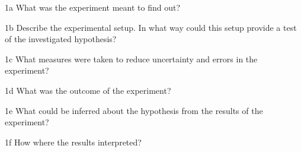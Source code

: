 \documentclass[a4paper,twoside=false,abstract=false,numbers=noenddot,
titlepage=false,headings=small,parskip=half,version=last]{scrartcl}
\begin{document}

\begin{exercise}{1a}
    What was the experiment meant to find out?
\end{exercise}
\begin{solution}
\end{solution}
\begin{exercise}{1b}
    Describe the experimental setup. In what way could this setup provide a
    test of the investigated hypothesis?
\end{exercise}
\begin{solution}
\end{solution}
\begin{exercise}{1c}
    What measures were taken to reduce uncertainty and errors in the
    experiment?
\end{exercise}
\begin{solution}
\end{solution}
\begin{exercise}{1d} 
    What was the outcome of the experiment?
\end{exercise}
\begin{solution}
\end{solution}
\begin{exercise}{1e}
    What could be inferred about the hypothesis from the results of the
    experiment?
\end{exercise}
\begin{solution}
\end{solution}
\begin{exercise}{1f} 
    How where the results interpreted?
\end{exercise}
\begin{solution}
\end{solution}
\end{document}
